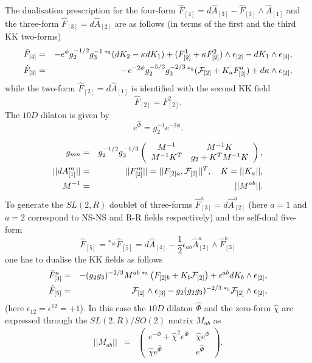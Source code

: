 \documentclass[a4paper,12pt]{article}
\begin{document}
The dualisation prescription for the four-form $\hat F_{[4]}=
d\hat A_{[3]}-\hat F_{[3]} \wedge \hat A_{[1]}$ and the
three-form $\hat F_{[3]}=d\hat A_{[2]}$ are as follows (in terms
of the first and the third KK two-forms)
\begin{eqnarray}
\hat F_{[4]} &=& -e^{\phi} g_2^{-1/2} g_3^{-1} \,{}^{*_5}
(dK_2-\kappa dK_1) + (F_{[2]}^1 + \kappa F_{[2]}^2) \wedge
\epsilon_{[2]} - dK_1 \wedge \epsilon_{[3]}, \nonumber\\
\hat F_{[3]} &=& -e^{-2\phi}g_2^{-5/3}g_3^{-2/3}\, {}^{*_5} ({\cal
F}_{[2]}+K_a F_{[2]}^a) + d \kappa \wedge \epsilon_{[2]},
\end{eqnarray}
while the two-form $\hat F_{[2]}=d\hat A_{[1]}$ is identified
with the second KK field
\begin{equation}
\hat F_{[2]}=F^2_{[2]}.
\end{equation}
The $10D$ dilaton is given by
\begin{equation}
e^{\hat\Phi} = g_2^{-1}e^{-2\phi}.
\end{equation}

\bigskip
{} \nopagebreak
\begin{eqnarray}
g_{mn} &=& g_2^{-1/2} g_3^{-1/3}
  \left( \begin{array}{cc} M^{-1} &  M^{-1}K \\
  M^{-1}K^T & g_2+K^TM^{-1}K \end{array}\right), \nonumber \\
||dA^m_{[1]}|| &=& ||F^m_{[2]}|| = ||F_{[2]a},{\cal F}_{[2]}||^T,
\quad K = ||K_a||, \nonumber \\
M^{-1} &=& ||M^{ab}||.
\end{eqnarray}
To generate the $SL(2,R)$ doublet of three-forms $\hat F_{[3]}^a
= d\hat A_{[2]}^a$ (here $a=1$ and $a=2$ correspond to NS-NS and
R-R fields respectively) and the self-dual five-form
\begin{equation}
\hat F_{[5]} = {}^{*_{10}} \hat F_{[5]} = d\hat A_{[4]} - \frac12
\epsilon_{ab} \hat A^a_{[2]} \wedge \hat F_{[3]}^b
\end{equation}
one has to dualise the KK fields as follows
\begin{eqnarray}
\hat F_{[3]}^a &=& -(g_2g_3)^{-2/3} M^{ab}\, {}^{*_5} \left(
F_{[2]b} + K_b{\cal F}_{[2]} \right) + \epsilon^{ab} dK_b \wedge
\epsilon_{[2]}, \nonumber\\
\hat F_{[5]} &=& {\cal F}_{[2]} \wedge \epsilon_{[3]} -
g_2(g_2g_3)^{-2/3}\, {}^{*_5} {\cal F}_{[2]} \wedge
\epsilon_{[2]},
\end{eqnarray}
(here $\epsilon_{12}=\epsilon^{12}=+1$). In this case the $10D$
dilaton $\hat\Phi$ and the zero-form $\hat\chi$ are expressed
through the $SL(2,R)/SO(2)$ matrix $M_{ab}$ as
\begin{eqnarray}
||M_{ab}|| &=& \left( \begin{array}{cc}
  e^{-\hat\Phi}+\hat\chi^2e^{\hat\Phi} & \hat\chi e^{\hat\Phi} \\
  \hat\chi e^{\hat\Phi} & e^{\hat\Phi} \end{array} \right).
\end{eqnarray}
\end{document}
